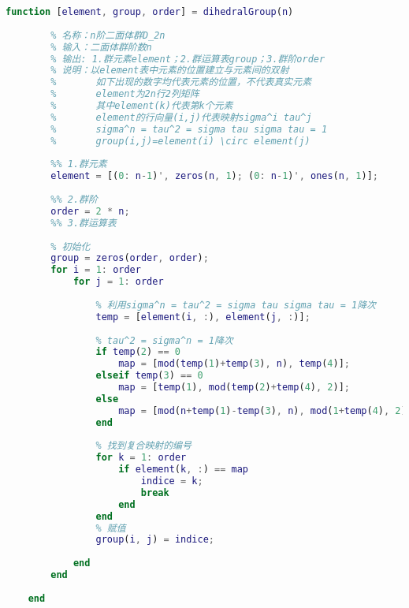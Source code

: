 \begin{lstlisting}[language=Matlab, caption={二面体群}, label={dihedralGroup}]
	function [element, group, order] = dihedralGroup(n)
	
	    % 名称：n阶二面体群D_2n
	    % 输入：二面体群阶数n
	    % 输出: 1.群元素element；2.群运算表group；3.群阶order
	    % 说明：以element表中元素的位置建立与元素间的双射
	    %       如下出现的数字均代表元素的位置，不代表真实元素
	    %       element为2n行2列矩阵
	    %       其中element(k)代表第k个元素
	    %       element的行向量(i,j)代表映射sigma^i tau^j
	    %       sigma^n = tau^2 = sigma tau sigma tau = 1
	    %       group(i,j)=element(i) \circ element(j)
	
	    %% 1.群元素
	    element = [(0: n-1)', zeros(n, 1); (0: n-1)', ones(n, 1)];
	
	    %% 2.群阶
	    order = 2 * n;
	    %% 3.群运算表
	
	    % 初始化
	    group = zeros(order, order);
	    for i = 1: order
	        for j = 1: order
	            
	            % 利用sigma^n = tau^2 = sigma tau sigma tau = 1降次
	            temp = [element(i, :), element(j, :)];
	
	            % tau^2 = sigma^n = 1降次
	            if temp(2) == 0
	                map = [mod(temp(1)+temp(3), n), temp(4)];
	            elseif temp(3) == 0
	                map = [temp(1), mod(temp(2)+temp(4), 2)];
	            else
	                map = [mod(n+temp(1)-temp(3), n), mod(1+temp(4), 2)];
	            end
	
	            % 找到复合映射的编号
	            for k = 1: order
	                if element(k, :) == map
	                    indice = k;
	                    break
	                end
	            end
	            % 赋值
	            group(i, j) = indice;
	
	        end
	    end
	
	end
	
\end{lstlisting}

